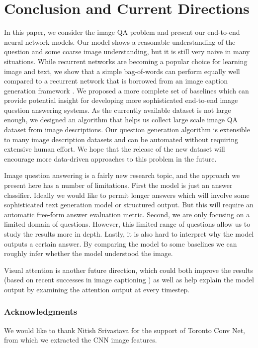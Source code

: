 \documentclass{article} %
\renewcommand{\#}[1]{\textbf{#1}}
\begin{document}
\section{Conclusion and Current Directions}

In this paper, we consider the image QA problem and present our end-to-end
neural network models. Our model shows a reasonable understanding of the
question and some coarse image understanding, but it is still very naive in
many situations. While recurrent networks are becoming a popular choice for
learning image and text, we show that a simple bag-of-words can perform equally
well compared to a recurrent network that is borrowed from an image caption
generation framework \cite{vinyals14}. We proposed a more complete set of
baselines which can provide potential insight for developing more sophisticated
end-to-end image question answering systems. As the currently available dataset
is not large enough, we designed an algorithm that helps us collect large scale
image QA dataset from image descriptions. Our question generation algorithm is
extensible to many image description datasets and can be automated without
requiring extensive human effort. We hope that the release of the new dataset
will encourage more data-driven approaches to this problem in the future.

Image question answering is a fairly new research topic, and the approach we
present here has a number of limitations. First the model is just an answer
classifier. Ideally we would like to permit longer answers which will involve
some sophisticated text generation model or structured output. But this will
require an automatic free-form answer evaluation metric. Second, we are only
focusing on a limited domain of questions. However, this limited range of
questions allow us to study the results more in depth. Lastly, it is also hard
to interpret why the model outputs a certain answer. By comparing the model to
some baselines we can roughly infer whether the model understood the image.

Visual attention is another future direction, which could both improve the
results (based on recent successes in image captioning \cite{xu15}) as well as
help explain the model output by examining the attention output at every
timestep.

\subsubsection*{Acknowledgments}

We would like to thank Nitish Srivastava for the support of Toronto Conv Net,
from which we extracted the CNN image features.

\begin{small}


\end{small}
\end{document}
